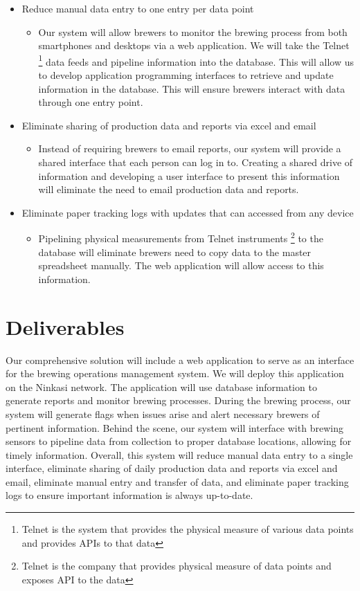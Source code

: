 \documentclass[draftclsnofoot,onecolumn,letterpaper,10pt]{IEEEtran}
\begin{document}
\begin{itemize}

	\item {Reduce manual data entry to one entry per data point}
		\begin{itemize}
			\item {Our system will allow brewers to monitor the brewing process from both smartphones and desktops via a web application. We will take the Telnet \footnote{Telnet is the system that provides the physical measure of various data points and provides APIs to that data} data feeds and pipeline information into the database. This will allow us to develop application programming interfaces to retrieve and update information in the database. This will ensure brewers interact with data through one entry point.}
		\end{itemize}


	\item {Eliminate sharing of production data and reports via excel and email}
	    \begin{itemize}
			\item {Instead of requiring brewers to email reports, our system will provide a shared interface that each person can log in to. Creating a shared drive of information and developing a user interface to present this information will eliminate the need to email production data and reports.}
			\end{itemize}


	\item {Eliminate paper tracking logs with updates that can accessed from any device}
	    \begin{itemize}
			\item {Pipelining physical measurements from Telnet instruments \footnote{Telnet is the company that provides physical measure of data points and exposes API to the data} to the database will eliminate brewers need to copy data to the master spreadsheet manually. The web application will allow access to this information.}
		\end{itemize}
\end{itemize}

\section{\textbf{Deliverables}}
Our comprehensive solution will include a web application to serve as an interface for the brewing operations management system. We will deploy this application on the Ninkasi network. The application will use database information to generate reports and monitor brewing processes. During the brewing process, our system will generate flags when issues arise and alert necessary brewers of pertinent information. Behind the scene, our system will interface with brewing sensors to pipeline data from collection to proper database locations, allowing for timely information. Overall, this system will reduce manual data entry to a single interface, eliminate sharing of daily production data and reports via excel and email, eliminate manual entry and transfer of data, and eliminate paper tracking logs to ensure important information is always up-to-date.
\end{document}
